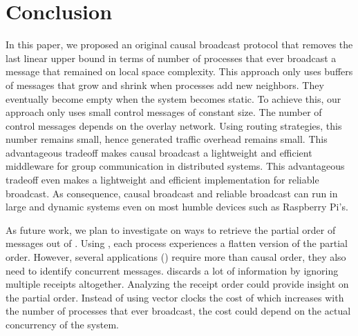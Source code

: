 
\section{Conclusion}
\label{sec:conclusion}


In this paper, we proposed an original causal broadcast protocol that removes
the last linear upper bound in terms of number of processes that ever broadcast
a message that remained on local space complexity. This approach only uses
buffers of messages that grow and shrink when processes add new neighbors. They
eventually become empty when the system becomes static. To achieve this, our
approach only uses small control messages of constant size. The number of
control messages depends on the overlay network. Using routing strategies, this
number remains small, hence generated traffic overhead remains small. This
advantageous tradeoff makes causal broadcast a lightweight and efficient
middleware for group communication in distributed systems. This advantageous
tradeoff even makes \RPCBROADCAST a lightweight and efficient implementation
for reliable broadcast. As consequence, causal broadcast and reliable broadcast
can run in large and dynamic systems even on most humble devices such as
Raspberry Pi’s.

As future work, we plan to investigate on ways to retrieve the partial order of
messages out of \RPCBROADCAST. Using \RPCBROADCAST, each process experiences a
flatten version of the partial order. However, several applications (\REF)
require more than causal order, they also need to identify concurrent
messages. \RPCBROADCAST discards a lot of information by ignoring multiple
receipts altogether. Analyzing the receipt order could provide insight on the
partial order. Instead of using vector clocks the cost of which increases with
the number of processes that ever broadcast, the cost could depend on the actual
concurrency of the system.

